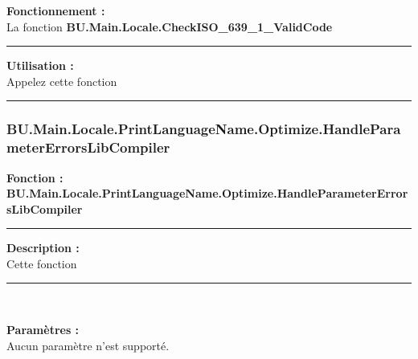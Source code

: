 \documentclass[a4paper,10pt]{article}
\begin{document}
    \begin{justify}
        \textbf{Fonctionnement :}\\[1\baselineskip]
        La fonction \textbf{\color{func}BU.Main.Locale.CheckISO\_639\_1\_ValidCode}
    \end{justify}


    \par\noindent\rule{\textwidth}{0.4pt}

    \begin{justify}
        \textbf{Utilisation :}\\[1\baselineskip]
        Appelez cette fonction
    \end{justify}



    \color{sec3}\par\noindent\rule{\textwidth}{0.4pt}\color{text}\setlength{\parskip}{1em}

    \color{sec3}
    \subsubsection{BU.Main.Locale.PrintLanguageName.Optimize.HandleParameterErrorsLibCompiler}\color{text}

    \textbf{Fonction : \color{func}BU.Main.Locale.PrintLanguageName.Optimize.HandleParameterErrorsLibCompiler}\setlength{\parskip}{1em}


    \par\noindent\rule{\textwidth}{0.4pt}

    \begin{justify}
        \textbf{Description :}\\[1\baselineskip]
        Cette fonction
    \end{justify}


    \par\noindent\rule{\textwidth}{0.4pt}\\

    \begin{justify}
        \textbf{Paramètres :}\\[1\baselineskip]
        Aucun paramètre n'est supporté.
    \end{justify}

\end{document}

